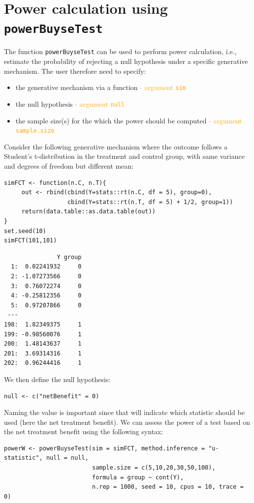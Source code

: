 \documentclass[12pt]{article}
\begin{document}
\section{Power calculation using \texttt{powerBuyseTest}}
\label{sec:orgc4b4e6e}

The function \texttt{powerBuyseTest} can be used to perform power
calculation, i.e., estimate the probability of rejecting a null
hypothesis under a specific generative mechanism. The user therefore
need to specify:
\begin{itemize}
\item the generative mechanism via a function \hfill \textcolor{orange}{- argument \texttt{sim}}
\item the null hypothesis \hfill \textcolor{orange}{- argument \texttt{null}}
\item the sample size(s) for the which the power should be computed  \hfill \textcolor{orange}{- argument \texttt{sample.size}}
\end{itemize}

\bigskip

Consider the following generative mechanism where the outcome follows
a Student's t-distribution in the treatment and control group, with same
variance and degrees of freedom but different mean:
\lstset{language=r,label= ,caption= ,captionpos=b,numbers=none}
\begin{lstlisting}
simFCT <- function(n.C, n.T){
     out <- rbind(cbind(Y=stats::rt(n.C, df = 5), group=0),
                  cbind(Y=stats::rt(n.T, df = 5) + 1/2, group=1))
     return(data.table::as.data.table(out))
}
set.seed(10)
simFCT(101,101)
\end{lstlisting}

\begin{verbatim}
               Y group
  1:  0.02241932     0
  2: -1.07273566     0
  3:  0.76072274     0
  4: -0.25812356     0
  5:  0.97207866     0
 ---                  
198:  1.82349375     1
199: -0.98560076     1
200:  1.48143637     1
201:  3.69314316     1
202:  0.96244416     1
\end{verbatim}

We then define the null hypothesis:
\lstset{language=r,label= ,caption= ,captionpos=b,numbers=none}
\begin{lstlisting}
null <- c("netBenefit" = 0)
\end{lstlisting}

Naming the value is important since that will indicate which statistic
should be used (here the net treatment benefit). We can assess the power of a
test based on the net treatment benefit using the following syntax:
\lstset{language=r,label= ,caption= ,captionpos=b,numbers=none}
\begin{lstlisting}
powerW <- powerBuyseTest(sim = simFCT, method.inference = "u-statistic", null = null,
                         sample.size = c(5,10,20,30,50,100),                         
                         formula = group ~ cont(Y), 
                         n.rep = 1000, seed = 10, cpus = 10, trace = 0)
\end{lstlisting}
\end{document}

